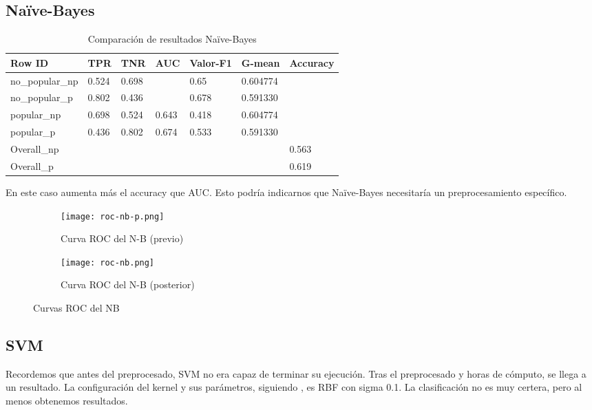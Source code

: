 \subsection{Naïve-Bayes}

\begin{table}[H]
	\centering
	\begin{tabular}{|l|l|l|l|l|l|l|}
		\hline
		Row ID          & TPR   & TNR   & AUC   & Valor-F1 & G-mean   & Accuracy \\ \hline
		no\_popular\_np & 0.524 & 0.698 &       & 0.65     & 0.604774 &          \\ \hline
		no\_popular\_p  & 0.802 & 0.436 &       & 0.678    & 0.591330 &          \\ \hline
		popular\_np     & 0.698 & 0.524 & 0.643 & 0.418    & 0.604774 &          \\ \hline
		popular\_p      & 0.436 & 0.802 & 0.674 & 0.533    & 0.591330 &          \\ \hline
		Overall\_np     &       &       &       &          &          & 0.563    \\ \hline
		Overall\_p      &       &       &       &          &          & 0.619    \\ \hline
	\end{tabular}
	\caption{Comparación de resultados Naïve-Bayes}
	\label{tab:compnb}
\end{table}

En este caso aumenta más el accuracy que AUC. Esto podría indicarnos que Naïve-Bayes necesitaría un preprocesamiento específico.

\begin{figure}[H]
	\begin{subfigure}{.5\textwidth}
		\centering
		\texttt{[image: roc-nb-p.png]}
		\caption{Curva ROC del N-B (previo)}
		\label{fig:rcnbp}
	\end{subfigure}%
	\begin{subfigure}{.5\textwidth}
		\centering
		\texttt{[image: roc-nb.png]}
		\caption{Curva ROC del N-B (posterior)}
		\label{fig:rcnb}
	\end{subfigure}
	\caption{Curvas ROC del NB}
	\label{fig:nb}
\end{figure}


\subsection{SVM}

Recordemos que antes del preprocesado, SVM no era capaz de terminar su ejecución. Tras el preprocesado y horas de cómputo, se llega a un resultado. La configuración del kernel y sus parámetros, siguiendo \cite{main-article}, es RBF con sigma 0.1. La clasificación no es muy certera, pero al menos obtenemos resultados.

